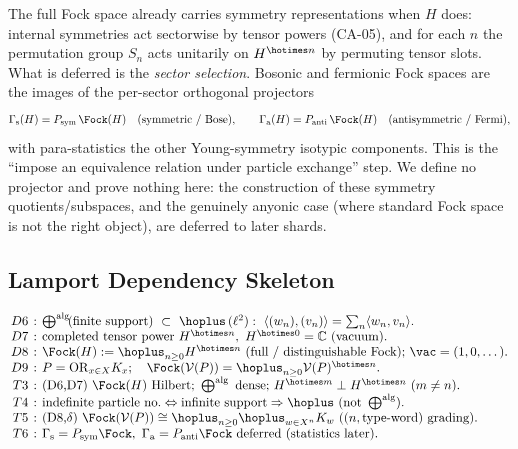 The full Fock space already carries symmetry representations when \(H\) does:
internal symmetries act sectorwise by tensor powers (CA-05), and for each \(n\)
the permutation group \(S_n\) acts unitarily on \(H^{\hotimes n}\) by permuting
tensor slots.  What is deferred is the \emph{sector selection}.  Bosonic and
fermionic Fock spaces are the images of the per-sector orthogonal projectors
\[
  \Gamma_{\mathrm s}(H)=P_{\mathrm{sym}}\,\Fock(H)
  \quad(\text{symmetric / Bose}),
  \qquad
  \Gamma_{\mathrm a}(H)=P_{\mathrm{anti}}\,\Fock(H)
  \quad(\text{antisymmetric / Fermi}),
\]
with para-statistics the other Young-symmetry isotypic components. This is the
``impose an equivalence relation under particle exchange'' step.
We define no projector and prove nothing here: the construction of these symmetry
quotients/subspaces, and the genuinely anyonic case (where standard Fock space is
not the right object), are deferred to later shards.

\subsection{Lamport Dependency Skeleton}

{\small
\[
\setlength{\arraycolsep}{2pt}
\begin{array}{rcl}
D6 &:& \bigoplus^{\mathrm{alg}}\!(\text{finite support})\ \subset\
       \hoplus\,(\ell^2):\ \langle(w_n),(v_n)\rangle=\textstyle\sum_n\langle w_n,v_n\rangle.\\
D7 &:& \text{completed tensor power } H^{\hotimes n},\ H^{\hotimes 0}=\mathbb C\ (\text{vacuum}).\\
D8 &:& \Fock(H):=\hoplus_{n\ge0}H^{\hotimes n}\ \text{(full / distinguishable Fock);}\ \vac=(1,0,\dots).\\
D9 &:& P=\mathrm{OR}_{x\in X}K_x;\quad \Fock(\mathcal V(P))=\hoplus_{n\ge0}\mathcal V(P)^{\hotimes n}.\\
T3 &:& \text{(D6,D7) } \Fock(H)\ \text{Hilbert; } \bigoplus^{\mathrm{alg}}\ \text{dense; }
       H^{\hotimes m}\perp H^{\hotimes n}\ (m\neq n).\\
T4 &:& \text{indefinite particle no.} \Leftrightarrow \text{infinite support} \Rightarrow \hoplus\ \text{(not } \bigoplus^{\mathrm{alg}}).\\
T5 &:& \text{(D8,}\delta\text{) } \Fock(\mathcal V(P))\cong\hoplus_{n\ge0}\hoplus_{w\in X^n}K_w\ ((n,\text{type-word})\text{ grading}).\\
T6 &:& \Gamma_{\mathrm s}=P_{\mathrm{sym}}\Fock,\ \Gamma_{\mathrm a}=P_{\mathrm{anti}}\Fock\ \text{deferred (statistics later)}.\\
\end{array}
\]
}

